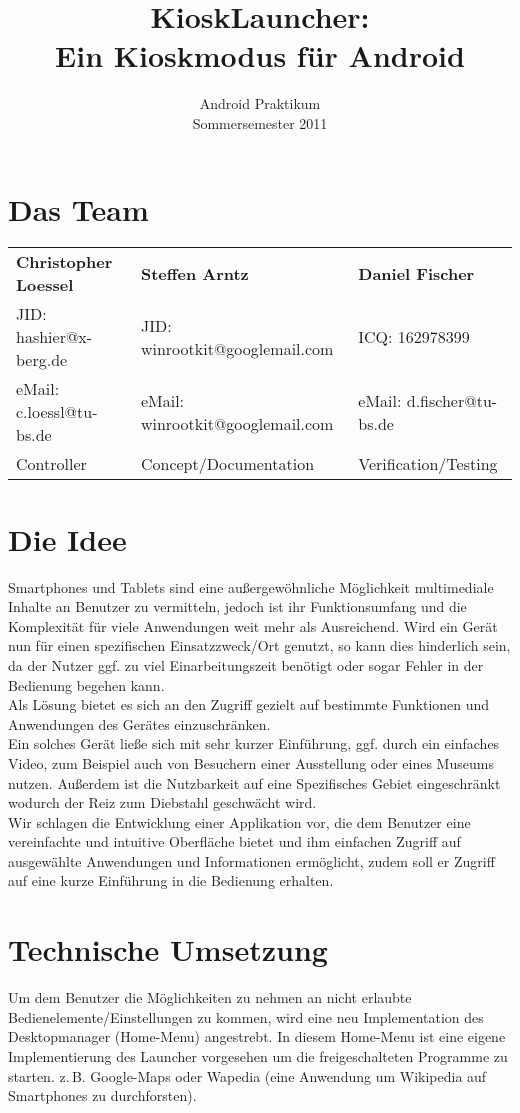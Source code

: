 \documentclass[12pt,a4paper,ngerman]{scrartcl}
\title{KioskLauncher: \\ Ein Kioskmodus für Android}
\subtitle{Android Praktikum \\ Sommersemester 2011}
\newcommand{\zB}{\mbox{z.\,B.}\xspace}
\begin{document}
\maketitle 

\section*{Das Team}
\begin{tabular}{ l l l }
  \textbf{Christopher Loessel} & \textbf{Steffen Arntz} & \textbf{Daniel Fischer} \smallskip \\ 
  JID: hashier@x-berg.de & JID: winrootkit@googlemail.com & ICQ: 162978399 \\
  eMail: c.loessl@tu-bs.de & eMail: winrootkit@googlemail.com & eMail: d.fischer@tu-bs.de  \\
  Controller & Concept/Documentation & Verification/Testing \\
\end{tabular}

\section*{Die Idee}
Smartphones und Tablets sind eine außergewöhnliche Möglichkeit multimediale Inhalte an Benutzer zu vermitteln, jedoch ist ihr Funktionsumfang und die Komplexität für viele Anwendungen weit mehr als Ausreichend. 
Wird ein Gerät nun für einen spezifischen Einsatzzweck/Ort genutzt, so kann dies hinderlich sein, da der Nutzer ggf. zu viel Einarbeitungszeit benötigt oder sogar Fehler in der Bedienung begehen kann. \\
Als Lösung bietet es sich an den Zugriff gezielt auf bestimmte Funktionen und Anwendungen des Gerätes einzuschränken. \\
Ein solches Gerät ließe sich mit sehr kurzer Einführung, ggf. durch ein einfaches Video, zum Beispiel auch von Besuchern einer Ausstellung oder eines Museums nutzen. Außerdem ist die Nutzbarkeit auf eine Spezifisches Gebiet eingeschränkt wodurch der Reiz zum Diebstahl geschwächt wird. \\
Wir schlagen die Entwicklung einer Applikation vor, die dem Benutzer eine vereinfachte und intuitive Oberfläche bietet und ihm einfachen Zugriff auf ausgewählte Anwendungen und Informationen ermöglicht, zudem soll er Zugriff auf eine kurze Einführung in die Bedienung erhalten.

\section*{Technische Umsetzung}
Um dem Benutzer die Möglichkeiten zu nehmen an nicht erlaubte Bedienelemente/Einstellungen zu kommen, wird eine neu Implementation des Desktopmanager (Home-Menu) angestrebt. In diesem Home-Menu ist eine eigene Implementierung des Launcher vorgesehen um die freigeschalteten Programme zu starten. \zB Google-Maps oder Wapedia (eine Anwendung um Wikipedia auf Smartphones zu durchforsten).
\end{document}

